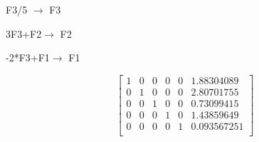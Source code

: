 \documentclass[12pt]{article}
\begin{document}
F3/5 $\longrightarrow $ F3

3F3+F2$\longrightarrow $ F2

-2*F3+F1$\longrightarrow $ F1

\[
\begin{bmatrix}
1 & 0 & 0 & 0 & 0 & 1.88304089\\ 
0 & 1 & 0 & 0 & 0 & 2.80701755\\
0 & 0 & 1 & 0 & 0 & 0.73099415\\   
0 & 0 & 0 & 1 & 0 & 1.43859649\\
0 & 0 & 0 & 0 & 1 & 0.093567251\\
\end{bmatrix}
\]





\vspace{0.5cm}
\renewcommand{\refname}{\MakeUppercase{REFERENCIAS}}


\end{document}

